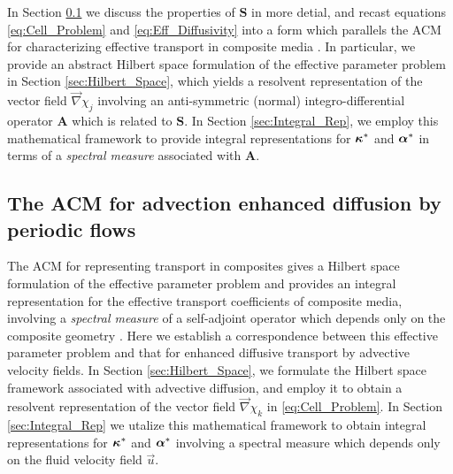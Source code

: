 \documentclass[11pt]{amsart}
\newcommand{\Sb}{\mathbf{S}}
\newcommand{\Ab}{\mathbf{A}}
\newcommand\balpha{\mbox{\boldmath${\alpha}$}}
\newcommand\bkappa{\mbox{\boldmath${\kappa}$}}
\begin{document}
In Section \ref{sec:ACM} we discuss the properties of $\Sb$ in more
detial, and recast equations \eqref{eq:Cell_Problem}
and \eqref{eq:Eff_Diffusivity} into a form which parallels the ACM for
characterizing effective transport in composite media
\cite{Golden:CMP-473}. In particular, we provide an abstract Hilbert
space formulation of the effective parameter problem in Section
\ref{sec:Hilbert_Space}, which yields a resolvent representation of the
vector field $\vec{\nabla}\chi_j$ involving an anti-symmetric (normal)
integro-differential operator $\Ab$ which is related to $\Sb$. In Section 
\ref{sec:Integral_Rep}, we employ this mathematical framework to
provide integral representations for $\bkappa^*$ and $\balpha^*$ in
terms of a \emph{spectral measure} associated with $\Ab$.   







\subsection{The ACM for advection enhanced diffusion by periodic
  flows} \label{sec:ACM}   
%
The ACM for representing transport in composites gives a Hilbert space
formulation of the effective parameter problem and provides an
integral representation for the effective transport coefficients of
composite media, involving a \emph{spectral measure} of a self-adjoint
operator which depends only on the composite geometry
\cite{Golden:CMP-473,Murphy:JMP:063506,MILTON:2002:TC}. Here 
we establish a correspondence between this effective parameter problem
and that for enhanced diffusive transport by advective velocity
fields. In Section \ref{sec:Hilbert_Space}, we formulate the Hilbert
space framework associated with advective diffusion, and employ it to
obtain a resolvent representation of the vector field $\vec{\nabla}\chi_k$ in
\eqref{eq:Cell_Problem}. In Section \ref{sec:Integral_Rep} we utalize
this mathematical framework to obtain integral representations for 
$\bkappa^*$ and $\balpha^*$ involving a spectral measure which depends
only on the fluid velocity field $\vec{u}$.    
\end{document}
